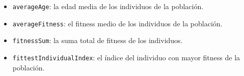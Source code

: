 \begin{itemize}
    \item \texttt{averageAge}: la edad media de los individuos de la población.
    \item \texttt{averageFitness}: el fitness medio de los individuos de la población.
    \item \texttt{fitnessSum}: la suma total de fitness de los individuos.
    \item \texttt{fittestIndividualIndex}: el índice del individuo con mayor fitness de la población.
\end{itemize}